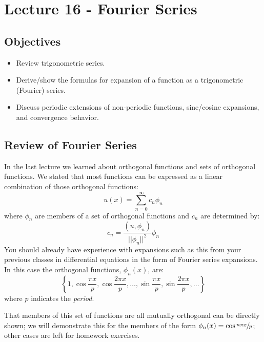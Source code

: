 \chapter{Lecture 16 - Fourier Series}
\label{ch:lec16}
\section{Objectives}
\begin{itemize}
\item Review trigonometric series.
\item Derive/show the formulas for expansion of a function as a trigonometric (Fourier) series.
\item Discuss periodic extensions of non-periodic functions, sine/cosine expansions, and convergence behavior.
\end{itemize}

\section{Review of Fourier Series}
In the last lecture we learned about orthogonal functions and sets of orthogonal functions.  We stated that most functions can be expressed as a linear combination of those orthogonal functions:
\begin{equation*}
u(x) = \sum\limits_{n=0}^{\infty} c_n \phi_n
\end{equation*}
where $\phi_n$ are members of a set of orthogonal functions and $c_n$ are determined by:
\begin{equation*}
c_n = \frac{(u,\phi_n)}{||\phi_n||^2}\phi_n
\end{equation*} 
You should already have experience with expansions such as this from your previous classes in differential equations in the form of Fourier series expansions.  In this case the orthogonal functions, $\phi_n(x)$, are:
\begin{equation*}
\left\{1,\cos{\frac{\pi x}{p}},\cos{\frac{2\pi x}{p}},\dots,\sin{\frac{\pi x}{p}}, \sin{\frac{2\pi x}{p}}, \dots \right\}
\end{equation*}
where $p$ indicates the \emph{period}. 

That members of this set of functions are all mutually orthogonal can be directly shown; we will demonstrate this for the members of the form $\phi_n(x) = \cos{\sfrac{n \pi x}{p}}$; other cases are left for homework exercises.

